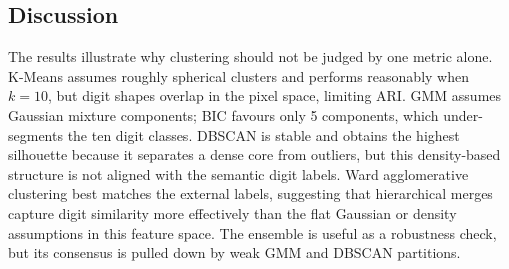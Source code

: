 \subsection{Discussion}

The results illustrate why clustering should not be judged by one metric alone. K-Means assumes roughly spherical clusters and performs reasonably when $k=10$, but digit shapes overlap in the pixel space, limiting ARI. GMM assumes Gaussian mixture components; BIC favours only 5 components, which under-segments the ten digit classes. DBSCAN is stable and obtains the highest silhouette because it separates a dense core from outliers, but this density-based structure is not aligned with the semantic digit labels. Ward agglomerative clustering best matches the external labels, suggesting that hierarchical merges capture digit similarity more effectively than the flat Gaussian or density assumptions in this feature space. The ensemble is useful as a robustness check, but its consensus is pulled down by weak GMM and DBSCAN partitions.

\clearpage
